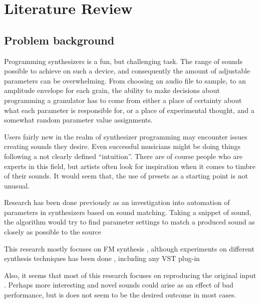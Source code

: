 \chapter{Literature Review}
\label{chapterlabel2}

\section{Problem background}

Programming synthesizers is a fun, but challenging task. The range of sounds possible to
achieve on such a device, and consequently the amount of adjustable parameters can be overwhelming.
From choosing an audio file to sample, to an amplitude envelope for each grain, the ability to make
decisions about programming a granulator has to come from either a place of certainty about what
each parameter is responsible for, or a place of experimental thought, and a somewhat random
parameter value assignments.

Users fairly new in the realm of synthesizer programming may encounter issues creating sounds they
desire. Even successful musicians might be doing things following a not clearly defined “intuition”.
There are of course people who are experts in this field, but artists often look for inspiration
when it comes to timbre of their sounds.
It would seem that, the use of presets as a starting point is not unusual.

Research has been done previously as an investigation into automation of parameters in synthesizers
based on sound matching. Taking a snippet of sound, the algorithm would try to
find parameter settings to match a produced sound as closely as possible to the
source%

This research mostly focuses on FM synthesis
, although
experiments on different synthesis techniques has been
done
, including any VST
plug-in

Also, it seems that most of this research focuses on reproducing the original
input
. Perhaps more interesting and novel sounds
could arise as an effect of bad performance, but is does not seem to be the
desired outcome in most cases.

